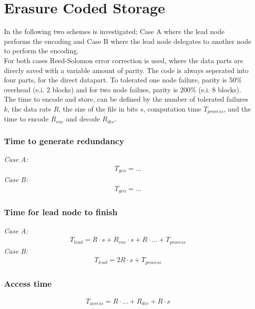 \section{Erasure Coded Storage} \label{sec:ec}
In the following two schemes is investigated; Case A where the lead node performs the encoding and Case B where the lead node delegates to another node to perform the encoding.\\
For both cases Reed-Solomon error correction is used, where the data parts are direcly saved with a variable amount of parity. The code is always seperated into four parts, for the direct datapart. To tolerated one node failure, parity is 50\% overhead (e.i. 2 blocks) and for two node failues, parity is 200\% (e.i. 8 blocks).\\
The time to encode and store, can be defined by the number of tolerated failures $k$, the data rate $R$, the size of the file in bits $s$, computation time $T_{process}$, and the time to encode $R_{enc}$ and decode $R_{dec}$.

\subsubsection*{Time to generate redundancy}
\textit{Case A:} 
\begin{align}
    T_{gen} = ...
\end{align}
\textit{Case B:} 
\begin{align}
    T_{gen} = ...
\end{align}

\subsubsection*{Time for lead node to finish}
\textit{Case A:} 
\begin{align}
    T_{lead} = R \cdot s + R_{enc} \cdot s + R \cdot ... + T_{process}
\end{align}
\textit{Case B:} 
\begin{align}
    T_{lead} = 2R \cdot s + T_{process}
\end{align}

\subsubsection*{Access time}
\begin{align}
    T_{access} = R \cdot ... + R_{dec} + R \cdot s
\end{align}

